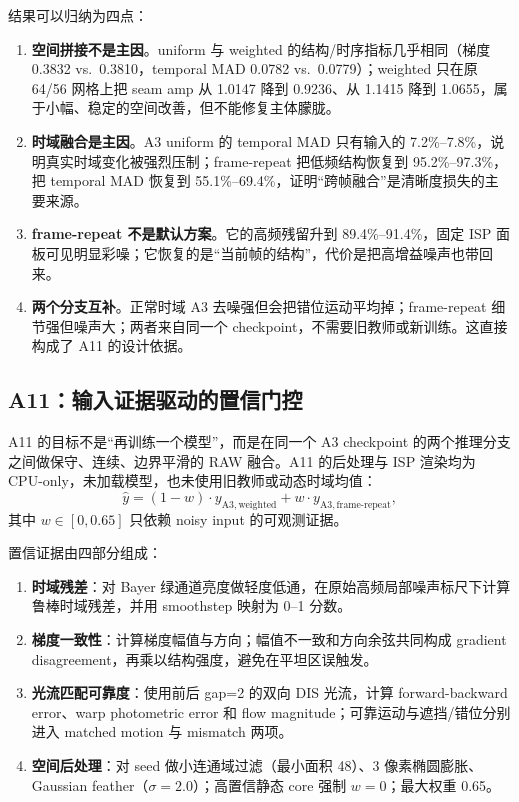 \documentclass[11pt,a4paper,UTF8,fontset=fandol]{ctexart}
\begin{document}
结果可以归纳为四点：

\begin{enumerate}
  \item \textbf{空间拼接不是主因}。uniform 与 weighted 的结构/时序指标几乎相同（梯度 0.3832 vs.\ 0.3810，temporal MAD 0.0782 vs.\ 0.0779）；weighted 只在原 64/56 网格上把 seam amp 从 1.0147 降到 0.9236、从 1.1415 降到 1.0655，属于小幅、稳定的空间改善，但不能修复主体朦胧。
  \item \textbf{时域融合是主因}。A3 uniform 的 temporal MAD 只有输入的 7.2\%--7.8\%，说明真实时域变化被强烈压制；frame-repeat 把低频结构恢复到 95.2\%--97.3\%，把 temporal MAD 恢复到 55.1\%--69.4\%，证明“跨帧融合”是清晰度损失的主要来源。
  \item \textbf{frame-repeat 不是默认方案}。它的高频残留升到 89.4\%--91.4\%，固定 ISP 面板可见明显彩噪；它恢复的是“当前帧的结构”，代价是把高增益噪声也带回来。
  \item \textbf{两个分支互补}。正常时域 A3 去噪强但会把错位运动平均掉；frame-repeat 细节强但噪声大；两者来自同一个 checkpoint，不需要旧教师或新训练。这直接构成了 A11 的设计依据。
\end{enumerate}

\subsection{A11：输入证据驱动的置信门控}

A11 的目标不是“再训练一个模型”，而是在同一个 A3 checkpoint 的两个推理分支之间做保守、连续、边界平滑的 RAW 融合。A11 的后处理与 ISP 渲染均为 CPU-only，未加载模型，也未使用旧教师或动态时域均值：
\begin{equation}
\hat{y} = (1-w)\cdot y_{\mathrm{A3,weighted}} + w\cdot y_{\mathrm{A3,frame\mbox{-}repeat}},
\label{eq:a11}
\end{equation}
其中 $w\in[0,0.65]$ 只依赖 noisy input 的可观测证据。

置信证据由四部分组成：

\begin{enumerate}
  \item \textbf{时域残差}：对 Bayer 绿通道亮度做轻度低通，在原始高频局部噪声标尺下计算鲁棒时域残差，并用 smoothstep 映射为 0--1 分数。
  \item \textbf{梯度一致性}：计算梯度幅值与方向；幅值不一致和方向余弦共同构成 gradient disagreement，再乘以结构强度，避免在平坦区误触发。
  \item \textbf{光流匹配可靠度}：使用前后 gap=2 的双向 DIS 光流\cite{r11}，计算 forward-backward error、warp photometric error 和 flow magnitude；可靠运动与遮挡/错位分别进入 matched motion 与 mismatch 两项。
  \item \textbf{空间后处理}：对 seed 做小连通域过滤（最小面积 48）、3 像素椭圆膨胀、Gaussian feather（$\sigma=2.0$）；高置信静态 core 强制 $w=0$；最大权重 0.65。
\end{enumerate}
\end{document}
